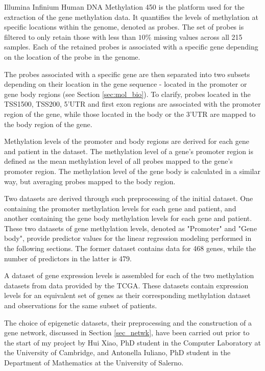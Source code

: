 Illumina Infinium Human DNA Methylation 450 is the platform used for the extraction of the gene methylation data. It quantifies the levels of methylation at specific locations within the genome, denoted as probes. The set of probes is filtered to only retain those with less than $10\%$ missing values across all 215 samples. Each of the retained probes is associated with a specific gene depending on the location of the probe in the genome.

The probes associated with a specific gene are then separated into two subsets depending on their location in the gene sequence - located in the promoter or gene body regions (see Section \ref{sec:mol_bio}). To clarify, probes located in the TSS1500, TSS200, 5'UTR and first exon regions are associated with the promoter region of the gene, while those located in the body or the 3'UTR are mapped to the body region of the gene.

Methylation levels of the promoter and body regions are derived for each gene and patient in the dataset. The methylation level of a gene's promoter region is defined as the mean methylation level of all probes mapped to the gene's promoter region. The methylation level of the gene body is calculated in a similar way, but averaging probes mapped to the body region.

Two datasets are derived through such preprocessing of the initial dataset. One containing the promoter methylation levels for each gene and patient, and another containing the gene body methylation levels for each gene and patient. These two datasets of gene methylation levels, denoted as "Promoter" and "Gene body", provide predictor values for the linear regression modeling performed in the following sections. The former dataset contains data for 468 genes, while the number of predictors in the latter is 479. 

A dataset of gene expression levels is assembled for each of the two methylation datasets from data provided by the TCGA. These datasets contain expression levels for an equivalent set of genes as their corresponding methylation dataset and observations for the same subset of patients.

The choice of epigenetic datasets, their preprocessing and the construction of a gene network, discussed in Section \ref{sec_netwk}, have been carried out prior to the start of my project by Hui Xiao, PhD student in the Computer Laboratory at the University of Cambridge, and Antonella Iuliano, PhD student in the Department of Mathematics at the University of Salerno.

